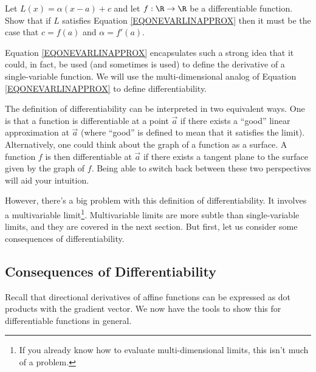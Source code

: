 \begin{exercise}
	Let $L(x)=\alpha(x-a)+c$ and let $f:\R\to\R$ be a differentiable function.
	Show that if $L$ satisfies Equation \eqref{EQONEVARLINAPPROX} then it
	must be the case that $c=f(a)$ and $\alpha=f'(a)$.
\end{exercise}

Equation \eqref{EQONEVARLINAPPROX} encapsulates such a strong idea that
it could, in fact, be used (and sometimes is used) to define the derivative
of a single-variable function.  We will use the multi-dimensional
analog of Equation \eqref{EQONEVARLINAPPROX} to define differentiability.

\DefDifferentiable

The definition of differentiability can be interpreted in two equivalent
ways.  One is that a function is differentiable at a point $\vec a$ if there exists a ``good''
linear approximation at $\vec a$ (where ``good'' is defined
to mean that it satisfies the limit).  Alternatively, one could think
about the graph of a function as a surface.  A function $f$ is then differentiable
at $\vec a$ if there exists a tangent plane to the surface given by the graph
of $f$.  Being able to switch back between these
two perspectives will aid your intuition.

However, there's a big problem with this definition of differentiability.  It
involves a multivariable limit\footnote{ If you already know how to evaluate
multi-dimensional limits, this isn't much of a problem.}.  Multivariable limits
are more subtle than single-variable limits, and they are covered in the next
section.  But first, let us consider some consequences of 
differentiability.

\subsection{Consequences of Differentiability}

Recall that directional derivatives of affine functions can be expressed
as dot products with the gradient vector.  We now have the tools
to show this for differentiable functions in general.

